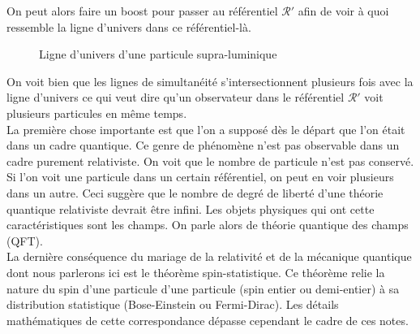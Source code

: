 \documentclass[a4paper,11pt]{report}
\theoremstyle{definition}
\theoremstyle{plain}
\theoremstyle{definition}
\theoremstyle{remark}
\newcommand{\x}{\times}
\newcommand{\R}{\mathcal{R}}
\begin{document}
            On peut alors faire un boost pour passer au référentiel $\R'$ afin de voir à quoi ressemble la ligne d'univers dans ce référentiel-là.
            
            \begin{figure}[H]
            \centering
            \label{fig:my_label}
            \caption{Ligne d'univers d'une particule supra-luminique}
            \end{figure}
            
            On voit bien que les lignes de simultanéité s'intersectionnent plusieurs fois avec la ligne d'univers ce qui veut dire qu'un observateur dans le référentiel $\R'$ voit plusieurs particules en même temps.\\
            
            La première chose importante est que l'on a supposé dès le départ que l'on était dans un cadre quantique. Ce genre de phénomène n'est pas observable dans un cadre purement relativiste. On voit que le nombre de particule n'est pas conservé. Si l'on voit une particule dans un certain référentiel, on peut en voir plusieurs dans un autre. Ceci suggère que le nombre de degré de liberté d'une théorie quantique relativiste devrait être infini. Les objets physiques qui ont cette caractéristiques sont les champs. On parle alors de théorie quantique des champs (QFT).\\
            
            La dernière conséquence du mariage de la relativité et de la mécanique quantique dont nous parlerons ici est le théorème spin-statistique. Ce théorème relie la nature du spin d'une particule d'une particule (spin entier ou demi-entier) à sa distribution statistique (Bose-Einstein ou Fermi-Dirac). Les détails mathématiques de cette correspondance dépasse cependant le cadre de ces notes.
\end{document}
